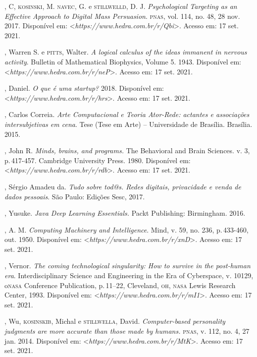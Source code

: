 \begin{bibliohedra}
, C, \textsc{kosinski}, M. \textsc{navec}, G. e \textsc{stillwelld}, D. J.
\emph{Psychological Targeting as an Effective Approach to Digital Mass
Persuasion}. \textsc{pnas}, vol. 114, no. 48, 28 nov. 2017. Disponível em:
\textless{}\emph{https://www.hedra.com.br/r/Qbi}\textgreater{}. Acesso em: 17 set. 2021.

, Warren S. e \textsc{pitts}, Walter. \emph{A logical calculus of the
ideas immanent in nervous activity}. Bulletin of Mathematical
Biophysics, Volume 5. 1943. Disponível em:
\textless{}\emph{https://www.hedra.com.br/r/neP}\textgreater{}. Acesso em: 17 set. 2021.

, Daniel. \emph{O que é uma startup?} 2018. Disponível em:
\textless{}\emph{https://www.hedra.com.br/r/hrs}\textgreater{}. Acesso em: 17 set. 2021.

, Carlos Correia. \emph{Arte Computacional e Teoria Ator-Rede:
actantes e associações intersubjetivas em cena}. Tese (Tese em Arte) --
Universidade de Brasília. Brasília. 2015.

, John R. \emph{Minds, brains, and programs.} The Behavioral and
Brain Sciences. v. 3, p.\,417-457. Cambridge University Press. 1980.
Disponível em: \textless{}\emph{https://www.hedra.com.br/r/rdb}\textgreater{}. Acesso em: 17 set. 2021.

, Sérgio Amadeu da. \emph{Tudo sobre tod@s. Redes digitais,
privacidade e venda de dados pessoais}. São Paulo: Edições Sesc, 2017.

, Yusuke. \emph{Java Deep Learning Essentials.} Packt
Publishing: Birmingham. 2016.

, A. M. \emph{Computing Machinery and Intelligence}. Mind, v.
59, no. 236, p.\,433-460, out. 1950. Disponível em: \textless{}\emph{https://www.hedra.com.br/r/xnD}\textgreater{}. Acesso em: 17 set. 2021.

, Vernor. \emph{The coming technological singularity: How to
survive in the post-human era}. Interdisciplinary Science and
Engineering in the Era of Cyberspace, v. 10129, o\textsc{nasa} Conference
Publication, p.\,11--22, Cleveland, \textsc{oh}, \textsc{nasa} Lewis Research Center,
1993. Disponível em: \textless{}\emph{https://www.hedra.com.br/r/mI1}\textgreater{}. Acesso em: 17 set. 2021.

, Wu, \textsc{kosinskib}, Michal e \textsc{stillwella}, David.
\emph{Computer-based personality judgments are more accurate than
those made by humans.} \textsc{pnas}, v. 112, no. 4, 27 jan. 2014. Disponível em:
\textless{}\emph{https://www.hedra.com.br/r/MtK}\textgreater{}. Acesso em: 17 set. 2021.
\end{bibliohedra}


